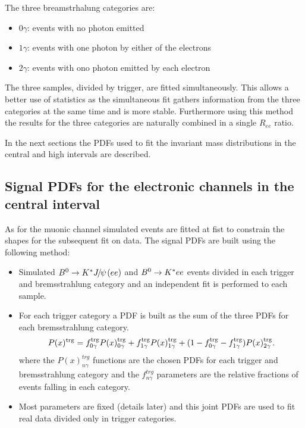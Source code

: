 The three breamstrhalung categories are:

\begin{itemize}
\item $0\gamma$: events with no photon emitted
\item $1\gamma$: events with one photon by either of the electrons
\item $2\gamma$: events with ono photon emitted by each electron
\end{itemize}

The three samples, divided by trigger, are fitted simultaneously.
This allows a better use of statistics as the simultaneous fit
gathers information from the three categories at the same time and is more stable.
Furthermore using this method the results for the three categories are
naturally combined in a single $R_{ee}$ ratio.

In the next sections the PDFs used to fit the invariant mass
distributions in the central and high \qsq intervals are described.



\subsection{Signal PDFs for the electronic channels in the central \qsq interval}
\label{sec:fit_ee_central}

As for the muonic channel simulated events are fitted at fist to constrain
the shapes for the subsequent fit on data. The signal PDFs are built using the following method:

\begin{itemize}
\item Simulated $\Bz\to\Kstar\jpsi(ee)$ and ${{B}^0}\rightarrow{\ensuremath{{K}^*}} ee$ events divided
in each trigger and bremsstrahlung category and an independent fit is performed to each sample.
\item For each trigger category a PDF is built as the sum of the three PDFs for each bremsstrahlung category.
\begin{equation}
P(x)^{\rm trg} = f^{\rm trg}_{0\gamma} P(x)^{\rm trg}_{0\gamma}  + f^{\rm trg}_{1\gamma} P(x)^{\rm trg}_{1\gamma} + (1 - f^{\rm trg}_{0\gamma} - f^{\rm trg}_{1\gamma}) P(x)^{\rm trg}_{2\gamma}.
\end{equation}
where the $P(x)^{trg}_{n\gamma}$ functions are the chosen PDFs for each trigger and bremsstrahlung category
and the $f^{trg}_{n\gamma}$ parameters are the relative fractions of events falling in each category.
\item Most parameters are fixed (details later) and this joint PDFs
are used to fit real data divided only in trigger categories.
\end{itemize}

